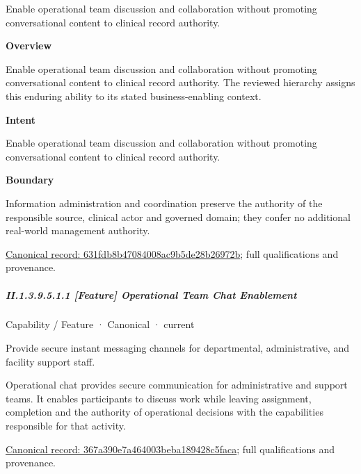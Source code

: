 Enable operational team discussion and collaboration without promoting conversational content to clinical record authority.



\textbf{Overview}



Enable operational team discussion and collaboration without promoting conversational content to clinical record authority. The reviewed hierarchy assigns this enduring ability to its stated business-enabling context.



\textbf{Intent}



Enable operational team discussion and collaboration without promoting conversational content to clinical record authority.



\textbf{Boundary}



Information administration and coordination preserve the authority of the responsible source, clinical actor and governed domain; they confer no additional real-world management authority.


{\footnotesize \href{../../../../../../../continuum/strategy/capability/631fdb8b47084008ac9b5de28b26972b.md}{Canonical record: 631fdb8b47084008ac9b5de28b26972b}; full qualifications and provenance.}\par
\subparagraph*{II.1.3.9.5.1.1 [Feature] Operational Team Chat Enablement}
\label{navigation:II.1.3.9.5.1.1}

\label{element:367a390e7a464003beba189428c5faca}
{\small Capability / Feature · Canonical · current}\par

Provide secure instant messaging channels for departmental, administrative, and facility support staff.



Operational chat provides secure communication for administrative and support teams. It enables participants to discuss work while leaving assignment, completion and the authority of operational decisions with the capabilities responsible for that activity.


{\footnotesize \href{../../../../../../../continuum/strategy/capability/feature/367a390e7a464003beba189428c5faca.md}{Canonical record: 367a390e7a464003beba189428c5faca}; full qualifications and provenance.}\par
